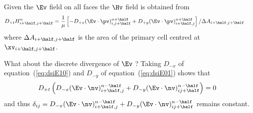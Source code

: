 \documentclass[10pt]{article}
\begin{document}
Given the $\Ev$ field on all faces the $\Hv$ field is obtained from
\begin{align*}
  D_{+t} H_{i\ph,j\ph}^{n} &=  {1\over\mu}\left[ - D_{+x} (\Ep)_{i,j\ph}^{n\ph}
               + D_{+y} (\Ep)_{i\ph,j}^{n\ph} \right] /\Delta A_{i\ph,j\ph}
\end{align*}
where $\Delta A_{i\ph,j\ph}$ is the area of the primary cell centred at $\xv_{i\ph,j\ph}$.
  
 What about the discrete divergence of $\Ev$ ?
Taking $D_{-x}$ of equation~(\ref{eq:dsiE10}) and  $D_{-y}$ of equation~(\ref{eq:dsiE01}) shows that 
\[
   D_{+t}\left( D_{-x} (\En)_{i\ph,j}^{n\mh} + D_{-y} (\En)_{ij\ph}^{n\mh} \right) = 0
\]
and thus $\delta_{ij} = D_{-x} (\En)_{i\ph,j}^{n\mh} + D_{-y} (\En)_{ij\ph}^{n\mh} $ remains constant.

\end{document}
